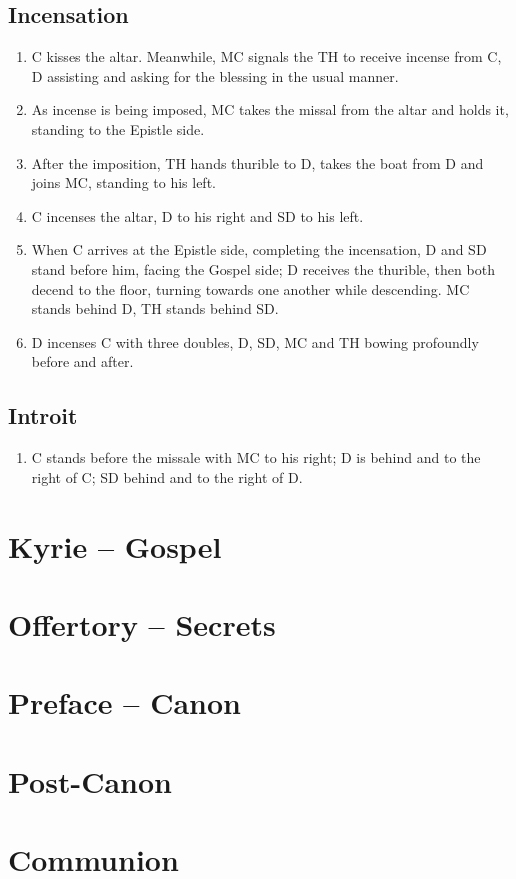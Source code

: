 \documentclass[letterpaper, twocolumn]{article}
\begin{document}
		\subsection*{Incensation}
		\begin{enumerate}
			\item C kisses the altar. Meanwhile, MC signals the TH to receive incense from C, D assisting and asking for the blessing in the usual manner.
			\item As incense is being imposed, MC takes the missal from the altar and holds it, standing to the Epistle side. 
			\item After the imposition, TH hands thurible to D, takes the boat from D and joins MC, standing to his left.
			\item C incenses the altar, D to his right and SD to his left.
			\item When C arrives at the Epistle side, completing the incensation, D and SD stand before him, facing the Gospel side; D receives the thurible, then both decend to the floor, turning towards one another while descending. MC stands behind D, TH stands behind SD.
			\item D incenses C with three doubles, D, SD, MC and TH bowing profoundly before and after.
		\end{enumerate}
		\subsection*{Introit}
		\begin{enumerate}
			\item C stands before the missale with MC to his right; D is behind and to the right of C; SD behind and to the right of D.
		\end{enumerate}
	\section*{Kyrie -- Gospel}
	\section*{Offertory -- Secrets}
	\section*{Preface -- Canon}
	\section*{Post-Canon}
	\section*{Communion}
\end{document}
